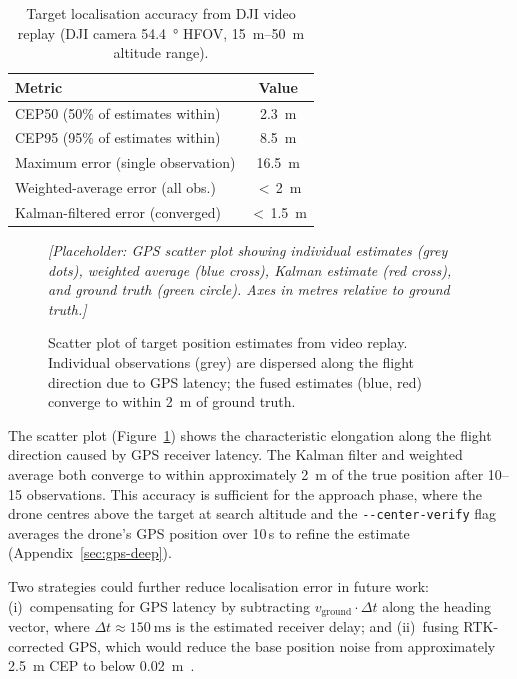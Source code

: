 \begin{table}[ht]
  \centering
  \caption{Target localisation accuracy from DJI video replay (DJI camera \SI{54.4}{\degree} HFOV, \SIrange{15}{50}{\metre} altitude range).}
  \label{tab:localisation-accuracy}
  \begin{tabular}{lc}
    \toprule
    \textbf{Metric} & \textbf{Value} \\
    \midrule
    CEP50 (50\% of estimates within) & \SI{2.3}{\metre} \\
    CEP95 (95\% of estimates within) & \SI{8.5}{\metre} \\
    Maximum error (single observation) & \SI{16.5}{\metre} \\
    Weighted-average error (all obs.) & $<$\,\SI{2}{\metre} \\
    Kalman-filtered error (converged) & $<$\,\SI{1.5}{\metre} \\
    \bottomrule
  \end{tabular}
\end{table}

\begin{figure}[ht]
  \centering
  \textit{[Placeholder: GPS scatter plot showing individual estimates (grey dots), weighted average (blue cross), Kalman estimate (red cross), and ground truth (green circle). Axes in metres relative to ground truth.]}
  \caption{Scatter plot of target position estimates from video replay. Individual observations (grey) are dispersed along the flight direction due to GPS latency; the fused estimates (blue, red) converge to within \SI{2}{\metre} of ground truth.}
  \label{fig:gps-scatter}
\end{figure}

The scatter plot (Figure~\ref{fig:gps-scatter}) shows the characteristic elongation along the flight direction caused by GPS receiver latency. The Kalman filter and weighted average both converge to within approximately \SI{2}{\metre} of the true position after 10--15 observations. This accuracy is sufficient for the approach phase, where the drone centres above the target at search altitude and the \texttt{-{}-center-verify} flag averages the drone's GPS position over 10\,s to refine the estimate (Appendix~\ref{sec:gps-deep}).

Two strategies could further reduce localisation error in future work: (i)~compensating for GPS latency by subtracting $v_{\mathrm{ground}} \cdot \Delta t$ along the heading vector, where $\Delta t \approx \SI{150}{\milli\second}$ is the estimated receiver delay; and (ii)~fusing RTK-corrected GPS, which would reduce the base position noise from approximately \SI{2.5}{\metre} CEP to below \SI{0.02}{\metre}~\cite{takasu2009development}.
